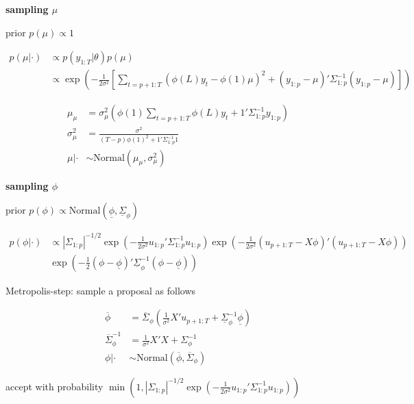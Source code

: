 \textbf{sampling $\mu$}

prior $p(\mu) \propto 1$

\begin{align}
p(\mu|\cdot) &\propto p(y_{1:T}|\theta) p(\mu) \\
&\propto \exp\left(-\frac{1}{2\sigma^2}\left[\sum_{t=p+1:T}(\phi(L)y_t - \phi(1)\mu)^2 + (y_{1:p}-\mu)'\Sigma_{1:p}^{-1}(y_{1:p}-\mu)\right]\right)
\end{align}

\begin{align}
\mu_\mu &= \sigma^2_\mu \left(\phi(1)\sum_{t=p+1:T}\phi(L)y_t + 1' \Sigma_{1:p}^{-1}y_{1:p}\right) \\
\sigma^2_\mu &= \frac{\sigma^2}{(T-p)\phi(1)^2 + 1'\Sigma_{1:p}^{-1}1} \\
\mu|\cdot &\sim \mathrm{Normal}(\mu_\mu, \sigma^2_\mu)
\end{align}

\textbf{sampling $\phi$}

prior $p(\phi) \propto \mathrm{Normal}(\underline{\phi}, \underline{\Sigma}_\phi)$

\begin{align}
p(\phi|\cdot) &\propto |\Sigma_{1:p}|^{-1/2} \exp\left(-\frac{1}{2\sigma^2}u_{1:p}'\Sigma_{1:p}^{-1} u_{1:p}\right) \exp\left(-\frac{1}{2\sigma^2}(u_{p+1:T}-X\phi)'(u_{p+1:T}-X\phi)\right) \\
&\exp\left(-\frac{1}{2}(\phi - \underline{\phi})'\underline{\Sigma}_\phi^{-1}(\phi - \underline{\phi})\right)
\end{align}

Metropolis-step: sample a proposal as follows

\begin{align}
\overline{\phi} &=\overline{\Sigma}_\phi\left(\frac{1}{\sigma^2}X'u_{p+1:T} + \underline{\Sigma}^{-1}_\phi \underline{\phi}\right) \\
\overline{\Sigma}_\phi^{-1} &= \frac{1}{\sigma^2} X'X + \Sigma_\phi^{-1} \\
\phi|\cdot &\sim \mathrm{Normal}(\overline{\phi}, \overline{\Sigma}_\phi)
\end{align}

accept with probability $\min\left(1, |\Sigma_{1:p}|^{-1/2} \exp\left(-\frac{1}{2\sigma^2}u_{1:p}'\Sigma_{1:p}^{-1} u_{1:p}\right)\right)$
